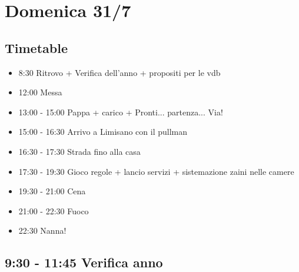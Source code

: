 \documentclass[../main.tex]{subfiles}
\begin{document}
    \section{Domenica 31/7}
    \subsection{Timetable}
    \begin{itemize}
        \item 8:30 Ritrovo + Verifica dell'anno + propositi per le vdb
        \item 12:00 Messa
        \item 13:00 - 15:00 Pappa + carico + Pronti... partenza... Via!
        \item 15:00 - 16:30 Arrivo a Limisano con il pullman
        \item 16:30 - 17:30 Strada fino alla casa
        \item 17:30 - 19:30 Gioco regole + lancio servizi + sistemazione zaini nelle camere
        \item 19:30 - 21:00 Cena
        \item 21:00 - 22:30 Fuoco
        \item 22:30 Nanna!
    \end{itemize}


    \subsection{9:30 - 11:45 Verifica anno}
\end{document}
